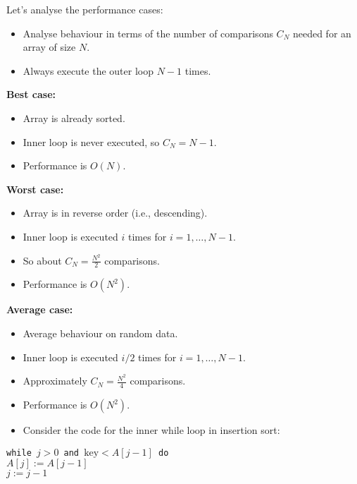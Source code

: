 \documentclass[a4paper,12pt]{article}
\begin{document}
\hrulefill

Let's analyse the performance cases:

\begin{itemize}
    \item Analyse behaviour in terms of the number of comparisons \(C_N\) needed for an array of size \(N\).
    \item Always execute the outer loop \(N-1\) times.
\end{itemize}

\textbf{Best case:}
\begin{itemize}
    \item Array is already sorted.
    \item Inner loop is never executed, so \(C_N = N-1\).
    \item Performance is \(O(N)\).
\end{itemize}

\textbf{Worst case:}
\begin{itemize}
    \item Array is in reverse order (i.e., descending).
    \item Inner loop is executed \(i\) times for \(i = 1, \dots, N-1\).
    \item So about \(C_N = \frac{N^2}{2}\) comparisons.
    \item Performance is \(O(N^2)\).
\end{itemize}

\textbf{Average case:}
\begin{itemize}
    \item Average behaviour on random data.
    \item Inner loop is executed \(i/2\) times for \(i = 1, \dots, N-1\).
    \item Approximately \(C_N = \frac{N^2}{4}\) comparisons.
    \item Performance is \(O(N^2)\).
\end{itemize}

\begin{itemize}
    \item Consider the code for the inner while loop in insertion sort:
\end{itemize}

\begin{tcolorbox}[colframe=black, colback=white]
\texttt{while \(j > 0\) and \(\text{key} < A[j-1]\) do} \\
\hspace*{1cm}\(A[j] := A[j-1]\) \\
\hspace*{1cm}\(j := j-1\)
\end{tcolorbox}
\end{document}
